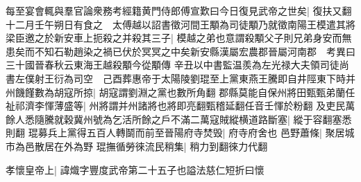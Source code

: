 每至宴會輒與羣官論衆務考經籍黄門侍郎傅宣歎曰今日復見武帝之世矣|{
	復扶又翻}
十二月壬午朔日有食之　太傅越以詔書徵河間王顒為司徒顒乃就徵南陽王模遣其將梁臣邀之於新安車上扼殺之并殺其三子|{
	模越之弟也意謂殺顒父子則兄弟身安而無患矣而不知石勒趙染之禍已伏於冥冥之中矣新安縣漢屬宏農郡晉屬河南郡　考異曰三十國晉春秋云東海王越殺顒今從顒傳}
辛丑以中書監温羨為左光禄大夫領司徒尚書左僕射王衍為司空　己酉葬惠帝于太陽陵劉琨至上黨東燕王騰即自井陘東下時并州饑饉數為胡寇所掠|{
	胡寇謂劉淵之黨也數所角翻}
郡縣莫能自保州將田甄甄弟蘭任祉祁濟李惲薄盛等|{
	州將謂并州諸將也將即亮翻甄稽延翻任音壬惲於粉翻}
及吏民萬餘人悉隨騰就穀冀州號為乞活所餘之戶不滿二萬寇賊縱横道路斷塞|{
	縱于容翻塞悉則翻}
琨募兵上黨得五百人轉鬬而前至晉陽府寺焚毁|{
	府寺府舍也}
邑野蕭條|{
	聚居城市為邑散居在外為野}
琨撫循勞徠流民稍集|{
	稍力到翻徠力代翻}


孝懷皇帝上|{
	諱熾字豐度武帝第二十五子也謚法慈仁短折曰懷}


